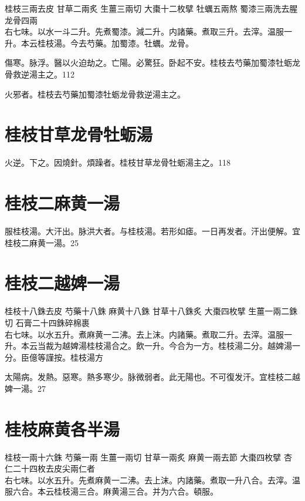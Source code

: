 桂枝{\scriptsize 三兩去皮} 甘草{\scriptsize 二兩炙} 生薑{\scriptsize 三兩切} 大棗{\scriptsize 十二枚擘} 牡蠣{\scriptsize 五兩熬} 蜀漆{\scriptsize 三兩洗去腥} 龙骨{\scriptsize 四兩}\\
右七味。以水一斗二升。先煮蜀漆。減二升。内諸藥。煮取三升。去滓。温服一升。本云桂枝湯。今去芍藥。加蜀漆。牡蠣。龙骨。

傷寒。脉浮。醫以火迫劫之。亡陽。{\khaaitp 必}驚狂。卧起不安。桂枝去芍藥加蜀漆牡蛎龙骨救逆湯主之。112

火邪者。桂枝去芍藥加蜀漆牡蛎龙骨救逆湯主之。

\section{桂枝甘草龙骨牡蛎湯}

火逆。下之。因燒針。煩躁者。桂枝甘草龙骨牡蛎湯主之。118

\section{桂枝二麻黄一湯}

服桂枝湯。大汗出。脉洪大者。与桂枝湯。若形如瘧。一日再发者。汗出便解。宜桂枝二麻黄一湯。25

\section{桂枝二越婢一湯}

桂枝{\scriptsize 十八銖去皮} 芍藥{\scriptsize 十八銖} 麻黄{\scriptsize 十八銖} 甘草{\scriptsize 十八銖炙} 大棗{\scriptsize 四枚擘} 生薑{\scriptsize 一兩二銖切} 石膏{\scriptsize 二十四銖碎棉裹}\\
右七味。以水五升。煮麻黄一二沸。去上沫。内諸藥。煮取二升。去滓。温服一升。本云当裁为越婢湯桂枝湯合之。飲一升。今合为一方。桂枝湯二分。越婢湯一分。{\scriptsize 臣億等謹按。桂枝湯方}

太陽病。发熱。惡寒。熱多寒少。脉微弱者。此无陽也。不可{\khaaitp 復}发汗。{\khaaitp 宜桂枝二越婢一湯。}27

\section{桂枝麻黄各半湯}

桂枝{\scriptsize 一兩十六銖} 芍藥{\scriptsize 一兩} 生薑{\scriptsize 一兩切} 甘草{\scriptsize 一兩炙} 麻黄{\scriptsize 一兩去節} 大棗{\scriptsize 四枚擘} 杏仁{\scriptsize 二十四枚去皮尖兩仁者}\\
右七味。以水五升。先煮麻黄一二沸。去上沫。内諸藥。煮取一升八合。去滓。温服六合。本云桂枝湯三合。麻黄湯三合。并为六合。頓服。

